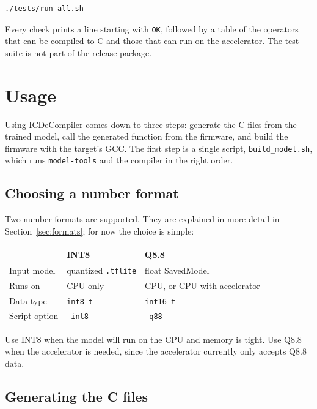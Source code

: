 \documentclass[11pt,a4paper]{article}
\begin{document}
\begin{lstlisting}[language=bash]
./tests/run-all.sh
\end{lstlisting}

Every check prints a line starting with \texttt{OK}, followed by a table of the
operators that can be compiled to C and those that can run on the accelerator.
The test suite is not part of the release package.

\section{Usage}
\label{sec:usage}

Using ICDeCompiler comes down to three steps: generate the C files from the
trained model, call the generated function from the firmware, and build the
firmware with the target's GCC. The first step is a single script,
\texttt{build\_model.sh}, which runs \texttt{model-tools} and the compiler in
the right order.

\subsection{Choosing a number format}

Two number formats are supported. They are explained in more detail in
Section~\ref{sec:formats}; for now the choice is simple:

\begin{center}
\begin{tabular}{lll}
\toprule
 & INT8 & Q8.8 \\
\midrule
Input model     & quantized \texttt{.tflite} & float SavedModel \\
Runs on         & CPU only                   & CPU, or CPU with accelerator \\
Data type       & \texttt{int8\_t}           & \texttt{int16\_t} \\
Script option   & \texttt{--int8}            & \texttt{--q88} \\
\bottomrule
\end{tabular}
\end{center}

Use INT8 when the model will run on the CPU and memory is tight. Use Q8.8 when
the accelerator is needed, since the accelerator currently only accepts Q8.8
data.

\subsection{Generating the C files}
\label{sec:generate}
\end{document}
